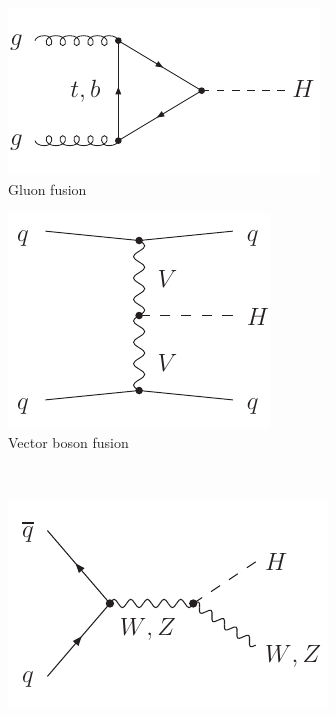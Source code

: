 
\begin{figure}
	\null\hfill
	\begin{subfigure}[b]{0.4\textwidth}
		\includegraphics[width=\textwidth]{axodraw/ggF.pdf}
		\caption{Gluon fusion}
		\label{fig:feyn:ggF}
	\end{subfigure}
	\hfill
	\begin{subfigure}[b]{0.3\textwidth}
		\includegraphics[width=\textwidth]{axodraw/VBF.pdf}
		\caption{Vector boson fusion}
		\label{fig:feyn:VBF}
	\end{subfigure}
	\hfill\null
	\\\bigskip
	\null\hfill
	\begin{subfigure}[b]{0.33\textwidth}
		\includegraphics[width=\textwidth]{axodraw/VH.pdf}

\end{subfigure}
\end{figure}
